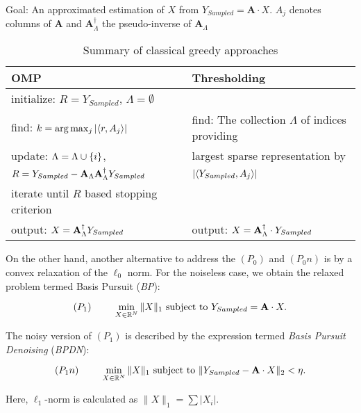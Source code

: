 \begin{table} 
\caption{Summary of classical greedy approaches}
\scriptsize{Goal: An approximated estimation of $X$ from $Y_{Sampled} = \mathbf{A} \cdot X$. } 
\scriptsize{$A_j$ denotes columns of $\mathbf{A}$ and $\mathbf{A}_\Lambda^\dagger$ the pseudo-inverse of $\mathbf{A}_\Lambda$ } \normalsize{} \\
\begin{tabular}{|l|l|}
\hline
{\bf OMP} & {\bf Thresholding} \\ 
\hline
initialize: $R=Y_{Sampled}$, $\Lambda=\emptyset$ & \\
find:   $k = \arg \max_{ j } |\langle r, A_j\rangle|$     & find: The collection $\Lambda$ of indices providing \\
update: $\Lambda=\Lambda \cup \{i\}$, & \phantom{find: } largest sparse representation by\\
\phantom{update: }$R=Y_{Sampled} - \mathbf{A}_\Lambda \mathbf{A}_\Lambda^\dagger Y_{Sampled} $ & 
\phantom{find: } $|\langle Y_{Sampled}, A_j\rangle|$ \\
iterate until $R$ based stopping criterion & \phantom{find: }  \\
output: $X = \mathbf{A}^\dagger_\Lambda Y_{Sampled}$ & output: $X=\mathbf{A}_\Lambda^\dagger \cdot Y_{Sampled}$\\ \hline
\end{tabular}
\label{table:greedy}
\end{table}

On the other hand, another alternative to address the $(P_0)$ and $(P_0n)$ is by a convex relaxation of the $\ell_0$ norm. For the noiseless case, we obtain the relaxed problem termed Basis Pursuit (\emph{BP}):

\begin{equation}
(P_1) \hspace{0.8cm}\min_{X \in \mathbb{R}^{N}} \|X\|_1 \mbox{ subject to } Y_{Sampled}=\mathbf{A} \cdot X \label{eq:BaiscCs_BP} .
\end{equation}

The noisy version of $(P_1)$ is described by the expression termed \emph{Basis Pursuit Denoising} (\emph{BPDN}):

\begin{equation}
(P_1n) \hspace{0.8cm}\min_{X \in \mathbb{R}^{N}} \|X\|_1 \mbox{ subject to } \|Y_{Sampled} - \mathbf{A} \cdot X\|_2<{\eta} .
\label{eq:BaiscCs_BPDN}
\end{equation}

Here, $\ell_1$-norm is calculated as $\|X\|_1 = \sum |X_i|$.

